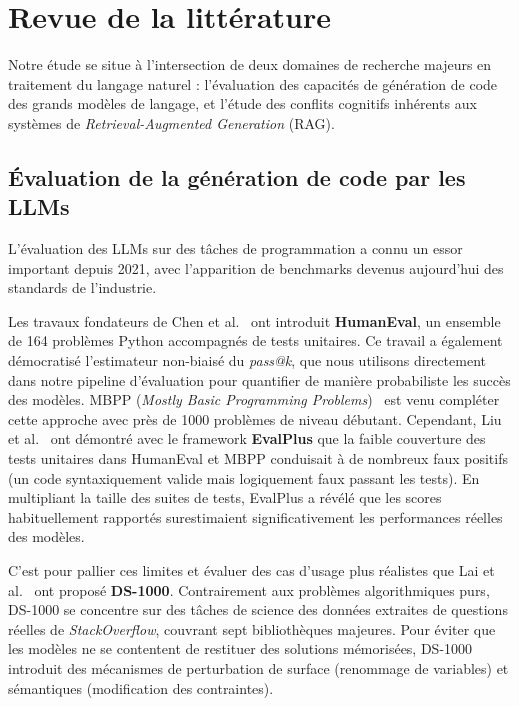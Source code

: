 \documentclass[11pt, a4paper]{article}
\begin{document}
\section{Revue de la littérature}

Notre étude se situe à l'intersection de deux domaines de recherche majeurs en traitement du langage naturel : l'évaluation des capacités de génération de code des grands modèles de langage, et l'étude des conflits cognitifs inhérents aux systèmes de \textit{Retrieval-Augmented Generation} (RAG).

\subsection{Évaluation de la génération de code par les LLMs}

L'évaluation des LLMs sur des tâches de programmation a connu un essor important depuis 2021, avec l'apparition de benchmarks devenus aujourd'hui des standards de l'industrie. 

Les travaux fondateurs de Chen et al.~\cite{chen2021} ont introduit \textbf{HumanEval}, un ensemble de 164 problèmes Python accompagnés de tests unitaires. Ce travail a également démocratisé l'estimateur non-biaisé du \textit{pass@k}, que nous utilisons directement dans notre pipeline d'évaluation pour quantifier de manière probabiliste les succès des modèles. MBPP (\textit{Mostly Basic Programming Problems})~\cite{austin2021mbpp} est venu compléter cette approche avec près de 1000 problèmes de niveau débutant. Cependant, Liu et al.~\cite{liu2023evalplus} ont démontré avec le framework \textbf{EvalPlus} que la faible couverture des tests unitaires dans HumanEval et MBPP conduisait à de nombreux faux positifs (un code syntaxiquement valide mais logiquement faux passant les tests). En multipliant la taille des suites de tests, EvalPlus a révélé que les scores habituellement rapportés surestimaient significativement les performances réelles des modèles.

C'est pour pallier ces limites et évaluer des cas d'usage plus réalistes que Lai et al.~\cite{lai2022ds1000} ont proposé \textbf{DS-1000}. Contrairement aux problèmes algorithmiques purs, DS-1000 se concentre sur des tâches de science des données extraites de questions réelles de \textit{StackOverflow}, couvrant sept bibliothèques majeures. Pour éviter que les modèles ne se contentent de restituer des solutions mémorisées, DS-1000 introduit des mécanismes de perturbation de surface (renommage de variables) et sémantiques (modification des contraintes). 
\end{document}
